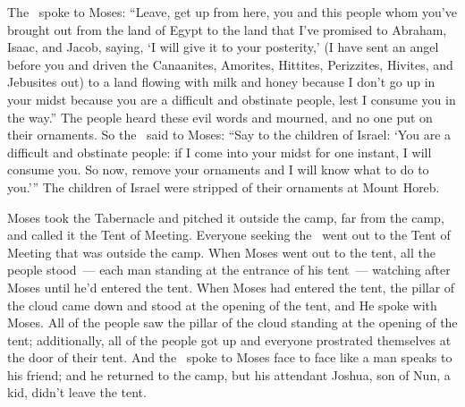 
\begin{inparaenum}
   The \lord\ spoke to Moses: ``Leave, get up from here, you and this people whom you've brought out from the land of Egypt to the land that I've promised to Abraham, Isaac, and Jacob, saying, `I will give it to your posterity,'%
   (I have sent an angel before you and driven the Canaanites, Amorites, Hittites, Perizzites, Hivites, and Jebusites out)%
   to a land flowing with milk and honey because I don't go up in your midst because you are a difficult and obstinate people, lest I consume you in the way.''%
   The people heard these evil words and mourned, and no one put on their ornaments.%
   So the \lord\ said to Moses: ``Say to the children of Israel: `You are a difficult and obstinate people: if I come into your midst for one instant, I will consume you. So now, remove your ornaments and I will know what to do to you.'\thinspace''%
   The children of Israel were stripped of their ornaments at Mount Horeb.%
  
   Moses took the Tabernacle and pitched it outside the camp, far from the camp, and called it the Tent of Meeting. Everyone seeking the \lord\ went out to the Tent of Meeting that was outside the camp.%
   When Moses went out to the tent, all the people stood~--- each man standing at the entrance of his tent~--- watching after Moses until he'd entered the tent.%
   When Moses had entered the tent, the pillar of the cloud came down and stood at the opening of the tent, and He spoke with Moses.%
   All of the people saw the pillar of the cloud standing at the opening of the tent; additionally, all of the people got up and everyone prostrated themselves at the door of their tent.%
   And the \lord\ spoke to Moses face to face like a man speaks to his friend; and he returned to the camp, but his attendant Joshua, son of Nun, a kid, didn't leave the tent.%
  

\end{inparaenum}
